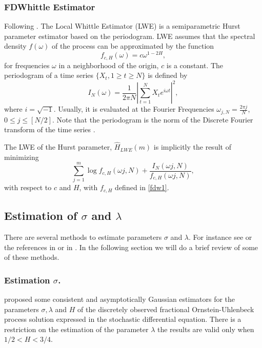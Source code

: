 \documentclass[smallextended]{svjour3}
\begin{document}
    \subsubsection{FDWhittle Estimator}

        Following \cite{pa-etal}. The Local Whittle Estimator (LWE) is a 
    semiparametric Hurst parameter estimator based on the periodogram.
    LWE assumes that the spectral density $f(\omega)$ of the process can be
    approximated by the function
    \begin{equation}\label{fdw1}
        f_{c,H}(\omega) = c\omega^{1-2H},
    \end{equation}
    for frequencies $\omega$ in a neighborhood of the origin, $c$ is a constant.
    The periodogram of a time series
    $\{X_t , 1 \ge t \ge N \}$ is defined by
    $$
        I_N (\omega)  = 
            \frac{1}{2\pi N}
            \left|
                \sum_{t=1}^N X_te^{i\omega t}
            \right|^2,
    $$
    where $i=\sqrt{-1}$. Usually, it is evaluated at the Fourier Frequencies
    $\omega_{j,N} = \frac{2\pi j}{N}$, $0 \le j \le [N/2]$.  Note that the
    periodogram is the norm of the Discrete Fourier transform of the time series
    \citep[see, for example,][sect. 6.1.2]{priestley}.

    The LWE of the Hurst parameter, $\hat{H}_{LWE}(m)$  is implicitly the result
    of minimizing
    $$
        \sum_{j=1}^m  
            \log f_{c,H} 
                (\omega j, N) 
                + 
                \frac{I_N(\omega j, N)}{ f_{c,H}(\omega j,N )},
    $$
    with respect to $c$ and $H$, with $f_{c,H}$ defined in \eqref{fdw1}.

\subsection{Estimation of $\sigma$ and  $\lambda$}

    There are several methods to estimate parameters $\sigma$ and  $\lambda$. 
    For instance see \cite{ra} or the references in \cite{ne-ti} or in 
    \cite{ku-mi}. In the following section we will do a brief review of
    some of these methods.

    \subsubsection{Estimation $\sigma$.}
    \label{sect-est}

    \citet{br-ia} proposed some consistent and asymptotically
    Gaussian estimators for the parameters $\sigma,\lambda$ and $H$ of
    the discretely observed fractional Ornstein-Uhlenbeck process solution
    expressed in the stochastic differential equation.
    There is a restriction on  the estimation of the parameter $\lambda$
    \textemdash the results are valid only when $ 1 / 2 < H < 3 / 4$. 
\end{document}
